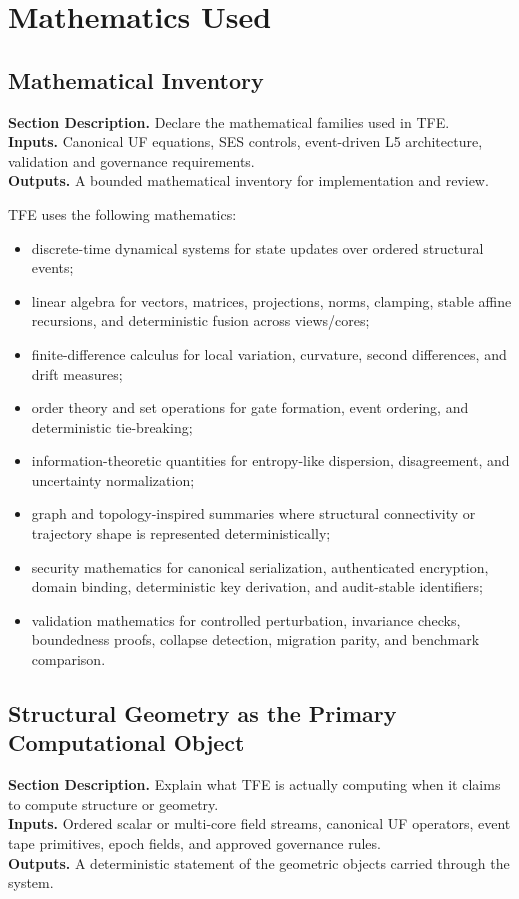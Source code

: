 \documentclass[11pt]{report}
\newcommand{\meta}[3]{\textbf{Section Description.} #1\\
\textbf{Inputs.} #2\\
\textbf{Outputs.} #3\par}
\begin{document}
\chapter{Mathematics Used}
\section{Mathematical Inventory}
\meta{Declare the mathematical families used in TFE.}{Canonical UF equations, SES controls, event-driven L5 architecture, validation and governance requirements.}{A bounded mathematical inventory for implementation and review.}

TFE uses the following mathematics:
\begin{itemize}
    \item discrete-time dynamical systems for state updates over ordered structural events;
    \item linear algebra for vectors, matrices, projections, norms, clamping, stable affine recursions, and deterministic fusion across views/cores;
    \item finite-difference calculus for local variation, curvature, second differences, and drift measures;
    \item order theory and set operations for gate formation, event ordering, and deterministic tie-breaking;
    \item information-theoretic quantities for entropy-like dispersion, disagreement, and uncertainty normalization;
    \item graph and topology-inspired summaries where structural connectivity or trajectory shape is represented deterministically;
    \item security mathematics for canonical serialization, authenticated encryption, domain binding, deterministic key derivation, and audit-stable identifiers;
    \item validation mathematics for controlled perturbation, invariance checks, boundedness proofs, collapse detection, migration parity, and benchmark comparison.
\end{itemize}


\section{Structural Geometry as the Primary Computational Object}
\meta{Explain what TFE is actually computing when it claims to compute structure or geometry.}{Ordered scalar or multi-core field streams, canonical UF operators, event tape primitives, epoch fields, and approved governance rules.}{A deterministic statement of the geometric objects carried through the system.}
\end{document}
